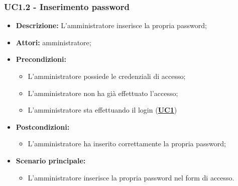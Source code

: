 \subsubsection{UC1.2 - Inserimento password}
\label{sec:UC1.2}
\begin{itemize}
	\item \textbf{Descrizione:} L’amministratore inserisce la propria password;
	\item \textbf{Attori:} amministratore;
	\item \textbf{Precondizioni:} 
	\begin{itemize}
		\item L’amministratore possiede le credenziali di accesso;
		\item L’amministratore non ha già effettuato l’accesso;
		\item L’amministratore sta effettuando il login (\hyperref[sec:UC1]{\textbf{UC1}})
	\end{itemize}
	\item \textbf{Postcondizioni:} 
	\begin{itemize}
		\item L’amministratore ha inserito correttamente la propria password;
	\end{itemize}
	\item \textbf{Scenario principale:} 
	\begin{itemize}
		\item L’amministratore inserisce la propria password nel form di accesso.
	\end{itemize}
\end{itemize}


